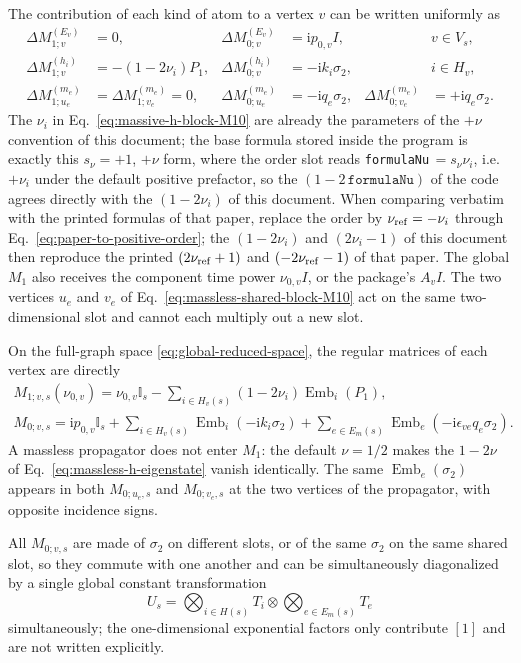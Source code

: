 \documentclass[11pt,a4paper]{article}
\newcommand{\ii}{\mathrm i}
\newcommand{\Id}{\mathbb I}
\newcommand{\Emb}{\operatorname{Emb}}
\begin{document}
The contribution of each kind of atom to a vertex $v$ can be written uniformly as
\begin{align}
 \Delta M_{1;v}^{(E_v)}&=0,
 &\Delta M_{0;v}^{(E_v)}&=\ii p_{0,v} I,
 &&v\in V_s,
 \label{eq:phase-block-M10}\\
 \Delta M_{1;v}^{(h_i)}&=-(1-2\nu_i)P_1,
 &\Delta M_{0;v}^{(h_i)}&=-\ii k_i\sigma_2,
 &&i\in H_v,
 \label{eq:massive-h-block-M10}\\
 \Delta M_{1;u_e}^{(m_e)}&=\Delta M_{1;v_e}^{(m_e)}=0,
 &\Delta M_{0;u_e}^{(m_e)}&=-\ii q_e\sigma_2,
 &\Delta M_{0;v_e}^{(m_e)}&=+\ii q_e\sigma_2.
 \label{eq:massless-shared-block-M10}
\end{align}
The $\nu_i$ in Eq.~\eqref{eq:massive-h-block-M10} are already the parameters of the $+\nu$ convention of this document; the base formula stored inside the program is exactly this $s_\nu=+1$, $+\nu$ form, where the order slot reads \texttt{formulaNu}$\,=s_\nu\nu_i$, i.e.\ $+\nu_i$ under the default positive prefactor, so the $(1-2\,\texttt{formulaNu})$ of the code agrees directly with the $(1-2\nu_i)$ of this document. When comparing verbatim with the printed formulas of that paper, replace the order by $\nu_{\rm ref}=-\nu_i$ through Eq.~\eqref{eq:paper-to-positive-order}; the $(1-2\nu_i)$ and $(2\nu_i-1)$ of this document then reproduce the printed $(2\nu_{\rm ref}+1)$ and $(-2\nu_{\rm ref}-1)$ of that paper. The global $M_1$ also receives the component time power $\nu_{0,v}I$, or the package's $A_vI$. The two vertices $u_e$ and $v_e$ of Eq.~\eqref{eq:massless-shared-block-M10} act on the same two-dimensional slot and cannot each multiply out a new slot.

On the full-graph space \eqref{eq:global-reduced-space}, the regular matrices of each vertex are directly
\begin{align}
 \boxed{
 M_{1;v,s}(\nu_{0,v})
 =\nu_{0,v}\Id_s
 -\sum_{i\in H_v(s)}(1-2\nu_i)\Emb_i(P_1),
 }
 \label{eq:global-M1}\\
 \boxed{
 M_{0;v,s}
 =\ii p_{0,v}\Id_s
 +\sum_{i\in H_v(s)}\Emb_i(-\ii k_i\sigma_2)
 +\sum_{e\in E_m(s)}\Emb_e(-\ii\epsilon_{ve}q_e\sigma_2).
 }
 \label{eq:global-M0}
\end{align}
A massless propagator does not enter $M_1$: the default $\nu=1/2$ makes the $1-2\nu$ of Eq.~\eqref{eq:massless-h-eigenstate} vanish identically. The same $\Emb_e(\sigma_2)$ appears in both $M_{0;u_e,s}$ and $M_{0;v_e,s}$ at the two vertices of the propagator, with opposite incidence signs.

All $M_{0;v,s}$ are made of $\sigma_2$ on different slots, or of the same $\sigma_2$ on the same shared slot, so they commute with one another and can be simultaneously diagonalized by a single global constant transformation
\begin{equation}
 U_s
 =\bigotimes_{i\in H(s)}T_i
 \otimes\bigotimes_{e\in E_m(s)}T_e
 \label{eq:global-T}
\end{equation}
simultaneously; the one-dimensional exponential factors only contribute $[1]$ and are not written explicitly.
\end{document}
